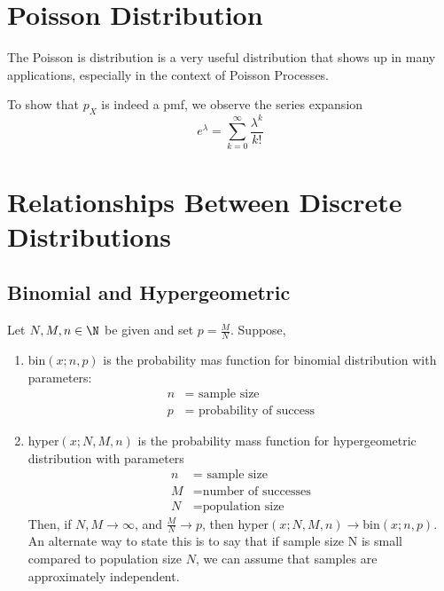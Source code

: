 \section{Poisson Distribution}
The Poisson is distribution is a very useful distribution that shows up in many applications, especially in the context of Poisson Processes. 



To show that $p_X$ is indeed a pmf, we observe the series expansion 
$$e^{\lambda}= \sum_{k=0}^\infty \frac{\lambda^k}{k!}$$





\section[Relationships Between Discrete Distributions]{Relationships Between Discrete Distributions}
\subsection[Binomial and Hypergeometric]{Binomial and Hypergeometric}
Let $N,M,n\in \N$ be given and set $p=\frac{M}{N}$. Suppose,
\begin{enumerate}[itemsep=0pt, topsep=1pt, partopsep=0pt,label=(\alph*)]
\item bin$(x;n,p)$ is the probability mas function for binomial distribution with parameters: \begin{align*}
n&=\text{ sample size}\\
p&=\text{ probability of success}
\end{align*}
\item hyper$(x;N,M,n)$ is the probability mass function for hypergeometric distribution with parameters\begin{align*}
n&=\text{ sample size}\\
M&=\text{number of successes}\\
N&=\text{population size}
\end{align*}
Then, if $N,M\to \infty$, and $\frac{M}{N}\to p$, then hyper$(x;N,M,n)\to$bin$(x;n,p)$. 
\\

An alternate way to state this is to say that if sample size N is small compared to population size $N$, we can assume that samples are approximately independent.
\end{enumerate}

